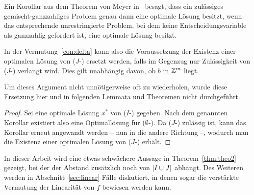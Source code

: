 \begin{remark}\label{rem:feasibility}
	Ein Korollar aus dem Theorem von Meyer in~\cite[Korollar 5.2]{Meyer1974} besagt, dass ein zulässiges gemischt-ganzzahliges Problem genau dann eine optimale Lösung besitzt, wenn das entsprechende unrestringierte Problem, bei dem keine Entscheidungsvariable als ganzzahlig gefordert ist, eine optimale Lösung besitzt.
	
	In der Vermutung~\ref{con:delta} kann also die Voraussetzung der Existenz einer optimalen Lösung von ($J$-\MIPI) ersetzt werden, falls im Gegenzug  nur Zulässigkeit von ($J$-\MIPI) verlangt wird.
	Dies gilt unabhängig davon, ob $b$ in $\mathbb{Z}^m$ liegt.
	
	Um dieses Argument nicht unnötigerweise oft zu wiederholen, wurde diese Ersetzung hier und in folgenden Lemmata und Theoremen nicht durchgeführt.
\end{remark}
\begin{proof}
	Sei eine optimale Lösung $x^*$ von ($I$-\MIPI) gegeben.
	Nach dem genannten Korollar existiert also eine Optimallösung für ($\emptyset$-\MIPI).
	Da ($J$-\MIPI) zulässig ist, kann das Korollar erneut angewandt werden -- nun in die andere Richtung --, wodurch man die Existenz einer optimalen Lösung von ($J$-\MIPI) erhält.
\end{proof}

In dieser Arbeit wird eine etwas schwächere Aussage in Theorem~\ref{thm:theo2} gezeigt, bei der der Abstand zusätzlich noch von $\lvert I\cup J \rvert$ abhängt.
Des Weiteren werden in Abschnitt~\ref{sec:linear} Fälle diskutiert, in denen sogar die verstärkte Vermutung der Linearität von $f$ bewiesen werden kann.
